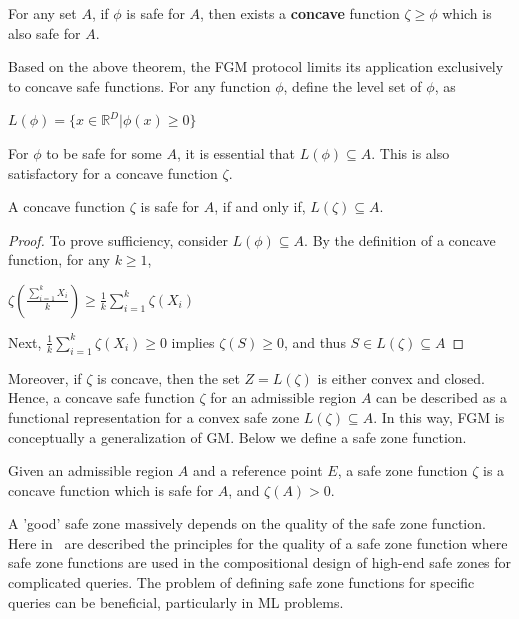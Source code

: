 \begin{theorem}
    For any set $A$, if $\phi$ is safe for $A$, then exists a \textbf{concave} function $\zeta \geq \phi$ which is also safe for $A$.
\end{theorem}

Based on the above theorem, the FGM protocol limits its application exclusively to concave safe functions.
For any function $\phi$, define the level set of $\phi$, as

\begin{center}
    $L(\phi) = \{x \in \mathbb{R}^D | \phi(x) \geq 0\}$
\end{center}

For $\phi$ to be safe for some $A$, it is essential that $L(\phi) \subseteq A$.
This is also satisfactory for a concave function $\zeta$.



\begin{prop}
    A concave function $\zeta$ is safe for $A$, if and only if, $L(\zeta) \subseteq A$.
\end{prop}
\begin{proof}
    To prove sufficiency, consider $L(\phi) \subseteq A$.
    By the definition of a concave function, for any $k \geq 1$,
    \begin{center}
        $\zeta\left(\frac{\sum_{i=1}^{k} X_i}{k}\right) \geq \frac{1}{k} \sum_{i=1}^{k} \zeta(X_i)$
    \end{center}
    Next, $\frac{1}{k} \sum_{i=1}^{k} \zeta(X_i) \geq 0$ implies $\zeta(S) \geq 0$, and thus $S \in L(\zeta) \subseteq A$
\end{proof}

Moreover, if $\zeta$ is concave, then the set $Z = L(\zeta)$ is either convex and closed.
Hence, a concave safe function $\zeta$ for an admissible region $A$ can be described as a functional representation for a convex safe zone $L(\zeta) \subseteq A$.
In this way, FGM is conceptually a generalization of GM\@.
Below we define a safe zone function.

\begin{definition}
    Given an admissible region $A$ and a reference point $E$, a safe zone function $\zeta$ is a concave function which is safe for $A$, and $\zeta(A) > 0$.
\end{definition}

A 'good' safe zone massively depends on the quality of the safe zone function.
Here in~\cite{garofalakis_distributed_nodate} are described the principles for the quality of a safe zone function
where safe zone functions are used in the compositional design of high-end safe zones for complicated queries.
The problem of defining safe zone functions for specific queries can be beneficial, particularly in ML problems.


